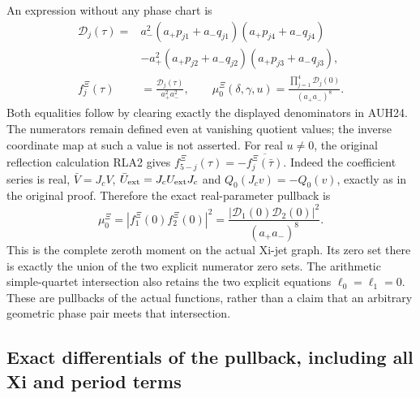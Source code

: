 \documentclass[11pt]{article}
\begin{document}
An expression without any phase chart is
\[
\begin{aligned}
 \mathcal D_j(\tau)
 ={}&a_-^2(a_+p_{j1}+a_-q_{j1})(a_+p_{j4}+a_-q_{j4})\\
 &-a_+^2(a_+p_{j2}+a_-q_{j2})(a_+p_{j3}+a_-q_{j3}),\\
 f_j^{\Xi}(\tau)&=\frac{\mathcal D_j(\tau)}{a_+^2a_-^2},\qquad
 \mu_0^{\Xi}(\delta,\gamma,u)
 =\frac{\prod_{j=1}^4\mathcal D_j(0)}{(a_+a_-)^8}.
\end{aligned}\tag{AUH25}
\]
Both equalities follow by clearing exactly the displayed denominators
in AUH24.  The numerators remain defined even at vanishing quotient
values; the inverse coordinate map at such a value is not asserted.
For real $u\ne0$, the original reflection calculation RLA2 gives
$f_{5-j}^{\Xi}(\tau)=-\overline{f_j^{\Xi}(\bar\tau)}$.
Indeed the coefficient series is real, $\bar V=J_cV$,
$\bar U_{\rm ext}=J_cU_{\rm ext}J_c$ and
$Q_0(J_cv)=-Q_0(v)$, exactly as in the original proof.
Therefore the exact real-parameter pullback is
\[
 \mu_0^{\Xi}
 =|f_1^{\Xi}(0)f_2^{\Xi}(0)|^2
 =\frac{|\mathcal D_1(0)\mathcal D_2(0)|^2}{(a_+a_-)^8}.
 \tag{AUH26}
\]
This is the complete zeroth moment on the actual Xi-jet graph.
Its zero set there is exactly the union of the two explicit
numerator zero sets.  The arithmetic simple-quartet intersection
also retains the two explicit equations $\ell_0=\ell_1=0$.
These are pullbacks of the actual functions, rather than a claim
that an arbitrary geometric phase pair meets that intersection.

\subsection{Exact differentials of the pullback, including all Xi and period terms}
\end{document}

